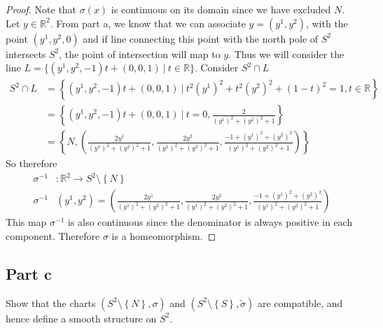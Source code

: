 \documentclass[a4paper]{article}
\begin{document}
\begin{proof}
  Note that $\sigma(x)$ is continuous on its domain since we have excluded $N$. Let $y \in \mathds{R}^2$. From part a, we know that we can associate $y = (y^1, y^2)$, with the point $(y^1, y^2, 0)$ and if line connecting this point with the north pole of $S^2$ intersects $S^2$, the point of intersection will map to $y$. Thus we will consider the line $L = \{(y^1, y^2, -1)t + (0,0,1) \ |\ t \in \mathds{R}\}$. Consider $S^2 \cap L$
  \[
    \begin{aligned}
      S^2 \cap L &= \left\{ (y^1, y^2, -1)t + (0,0,1) \ |\ t^2(y^1)^2 + t^2(y^2)^2 + (1 - t)^2 = 1, t \in \mathds{R}  \right\} \\
                 &= \left\{ (y^1, y^2, -1)t + (0,0,1) \ |\ t =0, \frac{2}{(y^1)^2 + (y^2)^2 + 1} \right\} \\
                 &= \left\{ N, \left( \frac{2y^1}{(y^1)^2 + (y^2)^2 + 1}, \frac{2y^2}{(y^1)^2 + (y^2)^2 + 1}, \frac{-1 + (y^1)^2 + (y^2)^2}{(y^1)^2 + (y^2)^2 + 1} \right) \right\}
    \end{aligned}
  \]
  So therefore
  \[
    \begin{aligned}
      \sigma^{-1}&: \mathds{R}^2 \rightarrow S^2 \setminus \left\{ N \right\} \\
      \sigma^{-1}&(y^1, y^2) = \left( \frac{2y^1}{(y^1)^2 + (y^2)^2 + 1}, \frac{2y^2}{(y^1)^2 + (y^2)^2 + 1}, \frac{-1 + (y^1)^2 + (y^2)^2}{(y^1)^2 + (y^2)^2 + 1} \right)
    \end{aligned}
  \]
  This map $\sigma^{-1}$ is also continuous since the denominator is always positive in each component. Therefore $\sigma$ is a homeomorphism. 
\end{proof}

\subsection*{Part c}%
\label{sub:Part c}
Show that the charts $(S^2 \setminus \left\{ N \right\}, \sigma)$ and $(S^2 \setminus \left\{ S \right\}, \tilde{\sigma})$ are compatible, and hence define a smooth structure on $S^2$.
\end{document}
